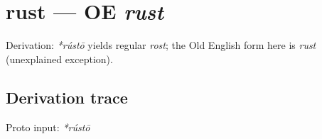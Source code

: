 \documentclass[
  british,
  a4paper,
  openany]{book}
\providecommand{\texorpdfstring}[2]{#1}
\begin{document}
\section{\texorpdfstring{rust --- OE
\emph{rust}}{rust --- OE rust}}\label{rust-oe-rust}


Derivation: \emph{*rústō} yields regular \emph{rost}; the Old English
form here is \emph{rust} (unexplained exception).

\subsection{Derivation trace}\label{derivation-trace-143}

Proto input: \emph{*rústō}

\begingroup
\setlength{\fboxsep}{6pt}
\end{document}
